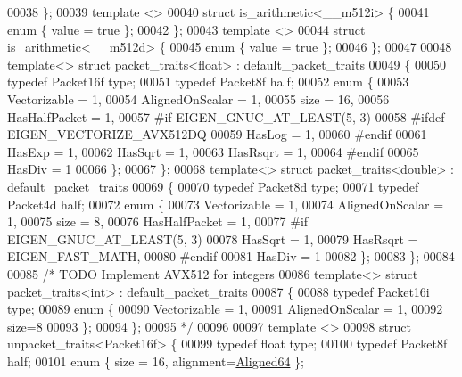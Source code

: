 \begin{DoxyCode}
00038 \};
00039 \textcolor{keyword}{template} <>
00040 \textcolor{keyword}{struct }is\_arithmetic<\_\_m512i> \{
00041   \textcolor{keyword}{enum} \{ value = \textcolor{keyword}{true} \};
00042 \};
00043 \textcolor{keyword}{template} <>
00044 \textcolor{keyword}{struct }is\_arithmetic<\_\_m512d> \{
00045   \textcolor{keyword}{enum} \{ value = \textcolor{keyword}{true} \};
00046 \};
00047 
00048 \textcolor{keyword}{template}<> \textcolor{keyword}{struct }packet\_traits<float>  : default\_packet\_traits
00049 \{
00050   \textcolor{keyword}{typedef} Packet16f type;
00051   \textcolor{keyword}{typedef} Packet8f half;
00052   \textcolor{keyword}{enum} \{
00053     Vectorizable = 1,
00054     AlignedOnScalar = 1,
00055     size = 16,
00056     HasHalfPacket = 1,
00057 \textcolor{preprocessor}{#if EIGEN\_GNUC\_AT\_LEAST(5, 3)}
00058 \textcolor{preprocessor}{#ifdef EIGEN\_VECTORIZE\_AVX512DQ}
00059     HasLog = 1,
00060 \textcolor{preprocessor}{#endif}
00061     HasExp = 1,
00062     HasSqrt = 1,
00063     HasRsqrt = 1,
00064 \textcolor{preprocessor}{#endif}
00065     HasDiv = 1
00066   \};
00067  \};
00068 \textcolor{keyword}{template}<> \textcolor{keyword}{struct }packet\_traits<double> : default\_packet\_traits
00069 \{
00070   \textcolor{keyword}{typedef} Packet8d type;
00071   \textcolor{keyword}{typedef} Packet4d half;
00072   \textcolor{keyword}{enum} \{
00073     Vectorizable = 1,
00074     AlignedOnScalar = 1,
00075     size = 8,
00076     HasHalfPacket = 1,
00077 \textcolor{preprocessor}{#if EIGEN\_GNUC\_AT\_LEAST(5, 3)}
00078     HasSqrt = 1,
00079     HasRsqrt = EIGEN\_FAST\_MATH,
00080 \textcolor{preprocessor}{#endif}
00081     HasDiv = 1
00082   \};
00083 \};
00084 
00085 \textcolor{comment}{/* TODO Implement AVX512 for integers}
00086 \textcolor{comment}{template<> struct packet\_traits<int>    : default\_packet\_traits}
00087 \textcolor{comment}{\{}
00088 \textcolor{comment}{  typedef Packet16i type;}
00089 \textcolor{comment}{  enum \{}
00090 \textcolor{comment}{    Vectorizable = 1,}
00091 \textcolor{comment}{    AlignedOnScalar = 1,}
00092 \textcolor{comment}{    size=8}
00093 \textcolor{comment}{  \};}
00094 \textcolor{comment}{\};}
00095 \textcolor{comment}{*/}
00096 
00097 \textcolor{keyword}{template} <>
00098 \textcolor{keyword}{struct }unpacket\_traits<Packet16f> \{
00099   \textcolor{keyword}{typedef} \textcolor{keywordtype}{float} type;
00100   \textcolor{keyword}{typedef} Packet8f half;
00101   \textcolor{keyword}{enum} \{ size = 16, alignment=\hyperlink{group__enums_gga45fe06e29902b7a2773de05ba27b47a1a0f4f4451618a2e67cade6b54ca0fc84b}{Aligned64} \};

\end{DoxyCode}
